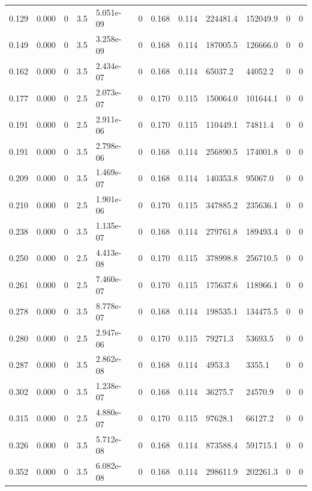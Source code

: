 \documentclass[preview]{standalone}
\begin{document}
{{\begin{tabular}{L{1.2cm}C{1.2cm} C{0.3cm}C{0.5cm} C{1.4cm}C{1.4cm} C{1.4cm}C{1.4cm} C{1.6cm}C{1.6cm} C{1.6cm}C{1.6cm}}
  0.129  &  0.000  & 0     & 3.5 &  5.051e-09  & 0  &  0.168&   0.114& 224481.4 & 152049.9   &  0 & 0  \\ 
  0.149  &  0.000  & 0     & 3.5 &  3.258e-09  & 0  &  0.168&   0.114& 187005.5 & 126666.0   &  0 & 0  \\ 
  0.162  &  0.000  & 0     & 3.5 &  2.434e-07  & 0  &  0.168&   0.114& 65037.2 & 44052.2   &  0 & 0  \\ 
  0.177  &  0.000  & 0     & 2.5 &  2.073e-07  & 0  &  0.170&   0.115& 150064.0 & 101644.1   &  0 & 0  \\ 
  0.191  &  0.000  & 0     & 2.5 &  2.911e-06  & 0  &  0.170&   0.115& 110449.1 & 74811.4   &  0 & 0  \\ 
  0.191  &  0.000  & 0     & 3.5 &  2.798e-06  & 0  &  0.168&   0.114& 256890.5 & 174001.8   &  0 & 0  \\ 
  0.209  &  0.000  & 0     & 3.5 &  1.469e-07  & 0  &  0.168&   0.114& 140353.8 & 95067.0   &  0 & 0  \\ 
  0.210  &  0.000  & 0     & 2.5 &  1.901e-06  & 0  &  0.170&   0.115& 347885.2 & 235636.1   &  0 & 0  \\ 
  0.238  &  0.000  & 0     & 3.5 &  1.135e-07  & 0  &  0.168&   0.114& 279761.8 & 189493.4   &  0 & 0  \\ 
  0.250  &  0.000  & 0     & 2.5 &  4.413e-08  & 0  &  0.170&   0.115& 378998.8 & 256710.5   &  0 & 0  \\ 
  0.261  &  0.000  & 0     & 2.5 &  7.460e-07  & 0  &  0.170&   0.115& 175637.6 & 118966.1   &  0 & 0  \\ 
  0.278  &  0.000  & 0     & 3.5 &  8.778e-07  & 0  &  0.168&   0.114& 198535.1 & 134475.5   &  0 & 0  \\ 
  0.280  &  0.000  & 0     & 2.5 &  2.947e-06  & 0  &  0.170&   0.115& 79271.3 & 53693.5   &  0 & 0  \\ 
  0.287  &  0.000  & 0     & 3.5 &  2.862e-08  & 0  &  0.168&   0.114& 4953.3 & 3355.1   &  0 & 0  \\ 
  0.302  &  0.000  & 0     & 3.5 &  1.238e-07  & 0  &  0.168&   0.114& 36275.7 & 24570.9   &  0 & 0  \\ 
  0.315  &  0.000  & 0     & 2.5 &  4.880e-07  & 0  &  0.170&   0.115& 97628.1 & 66127.2   &  0 & 0  \\ 
  0.326  &  0.000  & 0     & 3.5 &  5.712e-08  & 0  &  0.168&   0.114& 873588.4 & 591715.1   &  0 & 0  \\ 
  0.352  &  0.000  & 0     & 3.5 &  6.082e-08  & 0  &  0.168&   0.114& 298611.9 & 202261.3   &  0 & 0  \\ 

\end{tabular}}}
\end{document}
